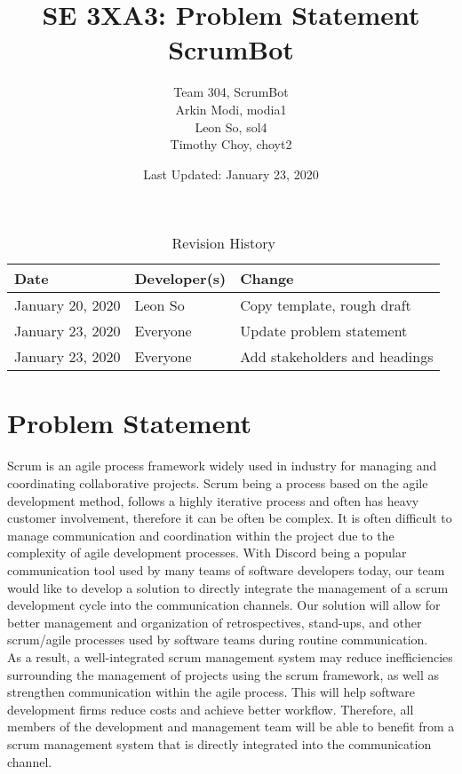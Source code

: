 \documentclass[12pt]{article}
\title{SE 3XA3: Problem Statement\\ScrumBot}
\author{
	Team 304, ScrumBot
		\\ Arkin Modi, modia1
        \\ Leon So, sol4
        \\ Timothy Choy, choyt2
}
\date{Last Updated: January 23, 2020}
\begin{document}
\begin{table}[hp]
    \caption{Revision History} \label{TblRevisionHistory}
    \begin{tabularx}{\textwidth}{llX}
        \toprule
            \textbf{Date} & \textbf{Developer(s)} & \textbf{Change}\\
        \midrule
            January 20, 2020 & Leon So & Copy template, rough draft\\
            January 23, 2020 & Everyone & Update problem statement\\
            January 23, 2020 & Everyone & Add stakeholders and headings\\
        \bottomrule
    \end{tabularx}
\end{table}

\newpage
\maketitle

\section{Problem Statement}
Scrum is an agile process framework widely used in industry for managing and coordinating collaborative projects. Scrum being a process based on the agile development method, follows a highly iterative process and often has heavy customer involvement, therefore it can be often be complex. It is often difficult to manage communication and coordination within the project due to the complexity of agile development processes. With Discord being a popular communication tool used by many teams of software developers today, our team would like to develop a solution to directly integrate the management of a scrum development cycle into the communication channels. Our solution will allow for better management and organization of retrospectives, stand-ups, and other scrum/agile processes used by software teams during routine communication.\\

As a result, a well-integrated scrum management system may reduce inefficiencies surrounding the management of projects using the scrum framework, as well as strengthen communication within the agile process. This will help software development firms reduce costs and achieve better workflow. Therefore, all members of the development and management team will be able to benefit from a scrum management system that is directly integrated into the communication channel.
\end{document}
